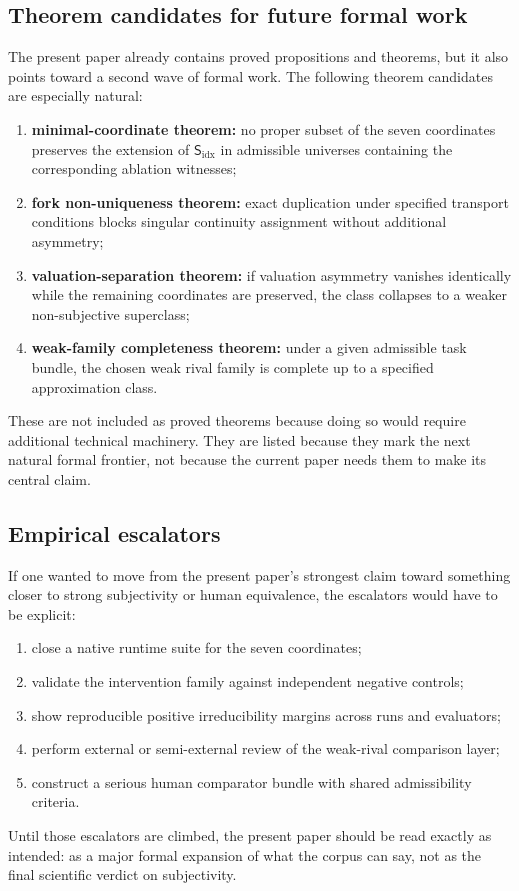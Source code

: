 \documentclass[11pt,a4paper]{article}
\theoremstyle{definition}
\newcommand{\Subfp}{\mathsf{S}_{\mathrm{idx}}}
\begin{document}
\subsection{Theorem candidates for future formal work}
The present paper already contains proved propositions and theorems, but it also points toward a second wave of formal work. The following theorem candidates are especially natural:
\begin{enumerate}[leftmargin=1.5em]
\item \textbf{minimal-coordinate theorem:} no proper subset of the seven coordinates preserves the extension of $\Subfp$ in admissible universes containing the corresponding ablation witnesses;
\item \textbf{fork non-uniqueness theorem:} exact duplication under specified transport conditions blocks singular continuity assignment without additional asymmetry;
\item \textbf{valuation-separation theorem:} if valuation asymmetry vanishes identically while the remaining coordinates are preserved, the class collapses to a weaker non-subjective superclass;
\item \textbf{weak-family completeness theorem:} under a given admissible task bundle, the chosen weak rival family is complete up to a specified approximation class.
\end{enumerate}
These are not included as proved theorems because doing so would require additional technical machinery. They are listed because they mark the next natural formal frontier, not because the current paper needs them to make its central claim.

\subsection{Empirical escalators}
If one wanted to move from the present paper's strongest claim toward something closer to strong subjectivity or human equivalence, the escalators would have to be explicit:
\begin{enumerate}[leftmargin=1.5em]
\item close a native runtime suite for the seven coordinates;
\item validate the intervention family against independent negative controls;
\item show reproducible positive irreducibility margins across runs and evaluators;
\item perform external or semi-external review of the weak-rival comparison layer;
\item construct a serious human comparator bundle with shared admissibility criteria.
\end{enumerate}
Until those escalators are climbed, the present paper should be read exactly as intended: as a major formal expansion of what the corpus can say, not as the final scientific verdict on subjectivity.
\end{document}
